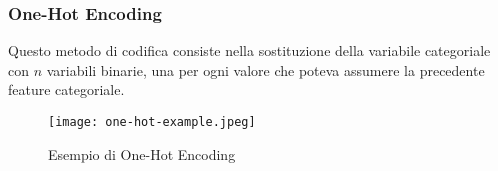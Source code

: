         \subsubsection{One-Hot Encoding}
            Questo metodo di codifica consiste nella sostituzione della variabile categoriale con $n$ variabili binarie, una per ogni valore che poteva assumere la precedente feature categoriale.
            \begin{figure}[h]
                \caption[short]{Esempio di One-Hot Encoding}
                \centering
                \texttt{[image: one-hot-example.jpeg]}
            \end{figure}
        
    \clearpage